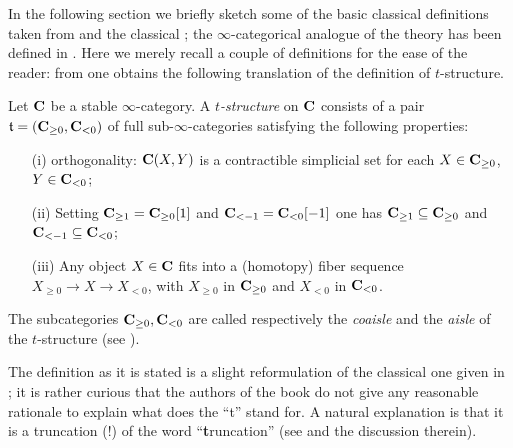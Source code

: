In the following section we briefly sketch some of the basic classical definitions taken from \cite{Kashiwara} and the classical \cite{BBDPervers}; the $\infty$\hyp{}categorical analogue of the theory has been defined in \cite[\S \textbf{1.2.1}]{LurieHA}. Here we merely recall a couple of definitions for the ease of the reader: from \cite[Def. \textbf{1.2.1.1} and \textbf{1.2.1.4}]{LurieHA} one obtains the following translation of the definition of $t$\hyp{}structure.
\begin{definition}\label{tistru}
Let $\mathbf{C}$ be a stable $\infty$\hyp{}category. A \emph{$t$\hyp{}structure} on $\mathbf{C}$ consists of a pair $\mathfrak{t}=(\mathbf{C}_{\ge 0},\mathbf{C}_{< 0})$ of full sub\hyp{}$\infty$\hyp{}categories satisfying the following properties:
\begin{itemize}
\item[(i)] orthogonality: $\mathbf{C}(X, Y)$ is a contractible simplicial set for each $X\in \mathbf{C}_{\ge 0}$, $Y\in \mathbf{C}_{< 0}$;
\item[(ii)] Setting $\mathbf{C}_{\geq 1}=\mathbf{C}_{\geq 0}[1]$ and $\mathbf{C}_{<-1}= \mathbf{C}_{<0}[-1]$ one has $\mathbf{C}_{\geq 1}\subseteq \mathbf{C}_{\geq 0}$ and $\mathbf{C}_{<-1}\subseteq \mathbf{C}_{<0}$;
\item[(iii)] Any object $X\in\mathbf{C}$ fits into a (homotopy) fiber sequence $X_{\ge 0}\to X\to X_{< 0}$, with $X_{\ge 0}$ in $\mathbf{C}_{\ge 0}$ and $X_{<0}$ in $\mathbf{C}_{< 0}$. 
\end{itemize}
The subcategories $\mathbf{C}_{\ge 0},\mathbf{C}_{< 0}$ are called respectively the \emph{coaisle} and the \emph{aisle} of the $t$\hyp{}structure (see \cite{KVaisles}).
\end{definition}
\begin{remark}
The definition as it is stated is a slight reformulation of the classical one given in \cite{BBDPervers}; it is rather curious that the authors of the book do not give any reasonable rationale to explain what does the ``t'' stand for. A natural explanation is that it is a truncation (!) of the word ``\textbf{t}runcation'' (see \cite{why-call-it-t} and the discussion therein). 
\end{remark}

